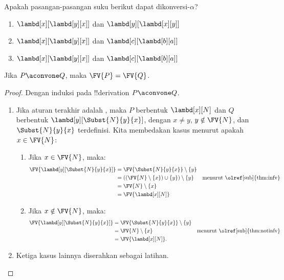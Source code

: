 \documentclass[../../../include/open-logic-section]{subfiles}
\begin{document}
\begin{prob}
  Apakah pasangan-pasangan suku berikut dapat dikonversi-$\alpha$?
  \begin{enumerate}
  \item $\lambd[x][\lambd[y][x]]$ dan $\lambd[y][\lambd[x][y]]$
  \item $\lambd[x][\lambd[y][x]]$ dan $\lambd[c][\lambd[b][a]]$
  \item $\lambd[x][\lambd[y][x]]$ dan $\lambd[c][\lambd[b][a]]$
  \end{enumerate}
\end{prob}

\begin{lem}
  Jika $P \aconvone Q$, maka $\FV{P} = \FV{Q}$.
\end{lem}

\begin{proof}
  Dengan induksi pada !!{derivation} $P \aconvone Q$.
  \begin{enumerate}
  \item Jika aturan terakhir adalah , maka $P$
    berbentuk $\lambd[x][N]$ dan $Q$ berbentuk
    $\lambd[y][\Subst{N}{y}{x}]$, dengan $x \neq y$, $y \notin \FV{N}$,
    dan $\Subst{N}{y}{x}$ terdefinisi. Kita membedakan kasus menurut apakah
    $x \in \FV{N}$:
    \begin{enumerate}
    \item Jika $x \in \FV{N}$, maka:
      \begin{align*}
        \FV{\lambd[y][\Subst{N}{y}{x}]} &=
        \FV{\Subst{N}{y}{x}} \setminus \{y\} \\
        & = ((\FV{N} \setminus \{x\}) \cup \{y\}) \setminus \{y\}
         && \text{menurut \olref[sub]{thm:infv}} \\
        & = \FV{N} \setminus \{x\} \\
        & = \FV{\lambd[x][N]}
      \end{align*}
    \item Jika $x \notin \FV{N}$, maka:
      \begin{align*}
        \FV{\lambd[y][\Subst{N}{y}{x}]}
        & = \FV{\Subst{N}{y}{x}} \setminus \{y\} \\
        & = \FV{N} \setminus \{x\}
         && \text{menurut \olref[sub]{thm:notinfv}} \\
        & = \FV{\lambd[x][N]}.
      \end{align*}
    \end{enumerate}
  \item Ketiga kasus lainnya diserahkan sebagai latihan.
  \end{enumerate}
\end{proof}
\end{document}
